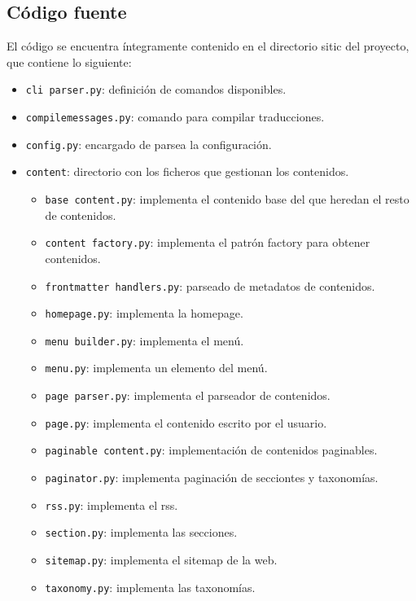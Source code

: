 \subsection{Código fuente}

El código se encuentra íntegramente contenido en el directorio sitic del proyecto, que contiene lo siguiente:

\begin{itemize}
\item \texttt{cli parser.py}: definición de comandos disponibles.
\item \texttt{compilemessages.py}: comando para compilar traducciones.
\item \texttt{config.py}: encargado de parsea la configuración.
\item \texttt{content}: directorio con los ficheros que gestionan los contenidos.
    \begin{itemize}
        \item \texttt{base content.py}: implementa el contenido base del que heredan el resto de contenidos.
       \item \texttt{content factory.py}: implementa el patrón factory para obtener contenidos.
       \item \texttt{frontmatter handlers.py}: parseado de metadatos de contenidos.
       \item \texttt{homepage.py}: implementa la homepage.
       \item \texttt{menu builder.py}: implementa el menú.
       \item \texttt{menu.py}: implementa un elemento del menú.
       \item \texttt{page parser.py}: implementa el parseador de contenidos.
       \item \texttt{page.py}: implementa el contenido escrito por el usuario.
       \item \texttt{paginable content.py}: implementación de contenidos paginables.
       \item \texttt{paginator.py}: implementa paginación de secciontes y taxonomías.
       \item \texttt{rss.py}: implementa el rss.
       \item \texttt{section.py}: implementa las secciones.
       \item \texttt{sitemap.py}: implementa el sitemap de la web.
       \item \texttt{taxonomy.py}: implementa las taxonomías.
    \end{itemize}


\end{itemize}
